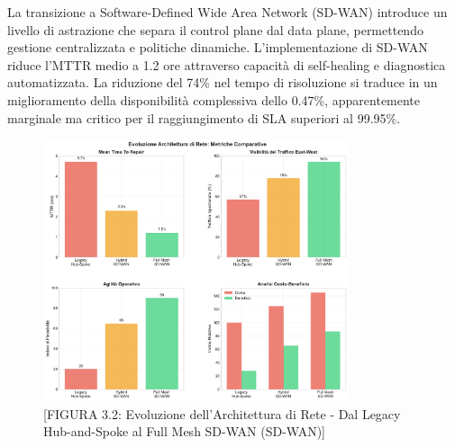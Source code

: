La transizione a Software-Defined Wide Area Network (SD-WAN) introduce un livello di astrazione che separa il control plane dal data plane, permettendo gestione centralizzata e politiche dinamiche. L'implementazione di SD-WAN riduce l'MTTR medio a 1.2 ore attraverso capacità di self-healing e diagnostica automatizzata. La riduzione del 74\% nel tempo di risoluzione si traduce in un miglioramento della disponibilità complessiva dello 0.47\%, apparentemente marginale ma critico per il raggiungimento di SLA superiori al 99.95\%.

\begin{figure}[htbp]
\centering
\includegraphics[width=0.8\textwidth]{thesis_figures/cap3/figura_3_2_network_evolution.pdf}
\caption{[FIGURA 3.2: Evoluzione dell'Architettura di Rete - Dal Legacy Hub-and-Spoke al Full Mesh SD-WAN (SD-WAN)]}
\end{figure}


    
